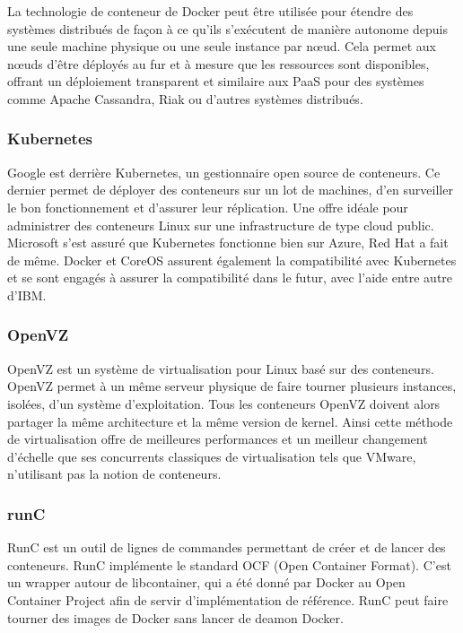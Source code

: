     La technologie de conteneur de Docker peut être utilisée pour étendre des systèmes distribués de façon à ce qu'ils s'exécutent de manière autonome depuis une seule machine physique ou une seule instance par nœud. Cela permet aux nœuds d'être déployés au fur et à mesure que les ressources sont disponibles, offrant un déploiement transparent et similaire aux PaaS pour des systèmes comme Apache Cassandra, Riak ou d'autres systèmes distribués.

    \subsubsection*{Kubernetes}
    Google est derrière Kubernetes, un gestionnaire open source de conteneurs. Ce dernier permet de déployer des conteneurs sur un lot de machines, d’en surveiller le bon fonctionnement et d’assurer leur réplication. Une offre idéale pour administrer des conteneurs Linux sur une infrastructure de type cloud public. Microsoft s'est assuré que Kubernetes fonctionne bien sur Azure, Red Hat a fait de même. Docker et CoreOS assurent également la compatibilité avec Kubernetes et se sont engagés à assurer la compatibilité dans le futur, avec l'aide entre autre d'IBM.

    \subsubsection*{OpenVZ}
    OpenVZ est un système de virtualisation pour Linux basé sur des conteneurs. OpenVZ permet à un même serveur physique de faire tourner plusieurs instances, isolées, d'un système d'exploitation. Tous les conteneurs OpenVZ doivent alors partager la même architecture et la même version de kernel. Ainsi cette méthode de virtualisation offre de meilleures performances et un meilleur changement d'échelle que ses concurrents classiques de virtualisation tels que VMware, n'utilisant pas la notion de conteneurs.

    \subsubsection*{runC}
    RunC est un outil de lignes de commandes permettant de créer et de lancer des conteneurs. RunC implémente le standard OCF (Open Container Format). C'est un wrapper autour de libcontainer, qui a été donné par Docker au Open Container Project afin de servir d'implémentation de référence. RunC peut faire tourner des images de Docker sans lancer de deamon Docker.


